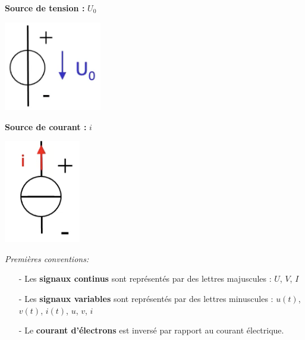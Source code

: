 \vspace{10px}
\begin{minipage}[htp]{0.45\textwidth}
    \textbf{Source de tension :} $U_0$ \\
    \begin{center}
        \includegraphics[width=0.32\textwidth]{chapters/chapter1/images/source_tension.png}
    \end{center}
\end{minipage}
\hfill
\vline
\hfill
\begin{minipage}[htp]{0.45\textwidth}
    \textbf{Source de courant :} $i$ \\
    \begin{center}
        \includegraphics[width=0.25\textwidth]{chapters/chapter1/images/source_courant.png}
    \end{center}
\end{minipage}



\textit{Premières conventions: } \\
\begin{itemize}
    \item[-] Les \textbf{signaux continus} sont représentés par des lettres majuscules : $U$, $V$, $I$
    \item[-] Les \textbf{signaux variables} sont représentés par des lettres minuscules : $u(t)$, $v(t)$, $i(t)$, $u$, $v$, $i$
    \item[-] Le \textbf{courant d'électrons} est inversé par rapport au courant électrique.
\end{itemize}

